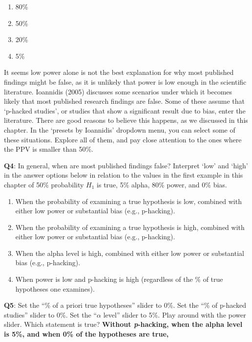 \documentclass[
  oneside]{krantz}
\providecommand{\tightlist}{%
  \setlength{\itemsep}{0pt}\setlength{\parskip}{0pt}}
\begin{document}
\begin{enumerate}
\def\labelenumi{\Alph{enumi})}
\tightlist
\item
  80\%
\item
  50\%
\item
  20\%
\item
  5\%
\end{enumerate}

It seems low power alone is not the best explanation for why most published findings might be false, as it is unlikely that power is low enough in the scientific literature. Ioannidis (2005) discusses some scenarios under which it becomes likely that most published research findings are false. Some of these assume that `p-hacked studies', or studies that show a significant result due to bias, enter the literature. There are good reasons to believe this happens, as we discussed in this chapter. In the `presets by Ioannidis' dropdown menu, you can select some of these situations. Explore all of them, and pay close attention to the ones where the PPV is smaller than 50\%.

\textbf{Q4}: In general, when are most published findings false? Interpret `low' and `high' in the answer options below in relation to the values in the first example in this chapter of 50\% probability \(H_1\) is true, 5\% alpha, 80\% power,
and 0\% bias.

\begin{enumerate}
\def\labelenumi{\Alph{enumi})}
\tightlist
\item
  When the probability of examining a true hypothesis is low, combined with either low power or substantial bias (e.g., p-hacking).
\item
  When the probability of examining a true hypothesis is high, combined with either low power or substantial bias (e.g., p-hacking).
\item
  When the alpha level is high, combined with either low power or substantial bias (e.g., p-hacking).
\item
  When power is low and p-hacking is high (regardless of the \% of true hypotheses one examines).
\end{enumerate}

\textbf{Q5}: Set the ``\% of a priori true hypotheses'' slider to 0\%. Set the ``\% of p-hacked studies'' slider to 0\%. Set the ``\(\alpha\) level'' slider to 5\%. Play around with the power slider. Which statement is true?
\textbf{Without \emph{p}-hacking, when the alpha level is 5\%, and when 0\% of the hypotheses are true, }
\end{document}
